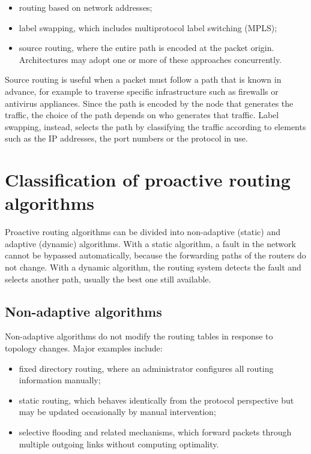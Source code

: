 \begin{itemize}
\item routing based on network addresses;
\item label swapping, which includes multiprotocol label switching (MPLS);
\item source routing, where the entire path is encoded at the packet origin. Architectures may adopt one or more of these approaches concurrently.
\end{itemize}
Source routing is useful when a packet must follow a path that is known in
advance, for example to traverse specific infrastructure such as firewalls or
antivirus appliances. Since the path is encoded by the node that generates the
traffic, the choice of the path depends on who generates that traffic. Label
swapping, instead, selects the path by classifying the traffic according to
elements such as the IP addresses, the port numbers or the protocol in use.

\section{Classification of proactive routing algorithms}

Proactive routing algorithms can be divided into non-adaptive (static) and adaptive (dynamic) algorithms. With a static algorithm, a fault in the network cannot be bypassed
automatically, because the forwarding paths of the routers do not change. With
a dynamic algorithm, the routing system detects the fault and selects another
path, usually the best one still available.

\begin{center}
\end{center}

\subsection{Non-adaptive algorithms}

Non-adaptive algorithms do not modify the routing tables in response to topology changes. Major examples include:

\begin{itemize}
\item fixed directory routing, where an administrator configures all routing information manually;
\item static routing, which behaves identically from the protocol perspective but may be updated occasionally by manual intervention;
\item selective flooding and related mechanisms, which forward packets through multiple outgoing links without computing optimality.
\end{itemize}

